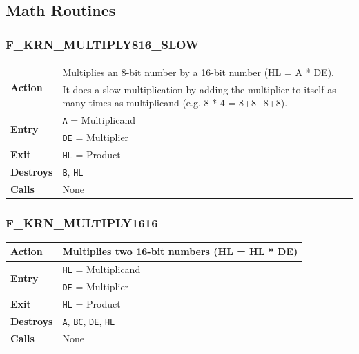 \documentclass[a4paper,11pt]{article}
\begin{document}
    \subsection{Math Routines}

        \subsubsection{F\_KRN\_MULTIPLY816\_SLOW}
        \label{func:fkrnmultiply816slow}
        \begin{tabular}{l p{9cm}}
            \hline\multirow[t]{2}{4em}{\textbf{Action}}
            & Multiplies an 8-bit number by a 16-bit number (HL = A * DE).\\
            & It does a slow multiplication by adding the multiplier to itself
            as many times as multiplicand (e.g. 8 * 4 = 8+8+8+8).\\
            \hline\multirow[t]{2}{4em}{\textbf{Entry}}
            & \texttt{A} = Multiplicand\\
            & \texttt{DE} = Multiplier\\
            \hline\textbf{Exit} & \texttt{HL} = Product \\
            \hline\textbf{Destroys} & \texttt{B}, \texttt{HL} \\
            \hline\textbf{Calls} & None\\
            \hline
        \end{tabular}

        \subsubsection{F\_KRN\_MULTIPLY1616}
        \label{func:fkrnmultiply1616}
        \begin{tabular}{l p{9cm}}
            \hline\textbf{Action}
            & Multiplies two 16-bit numbers (HL = HL * DE)\\
            \hline\multirow[t]{2}{4em}{\textbf{Entry}}
            & \texttt{HL} = Multiplicand\\
            & \texttt{DE} = Multiplier\\
            \hline\textbf{Exit} & \texttt{HL} = Product \\
            \hline\textbf{Destroys} & \texttt{A}, \texttt{BC}, \texttt{DE}, \texttt{HL} \\
            \hline\textbf{Calls} & None\\
            \hline
        \end{tabular}
\end{document}
